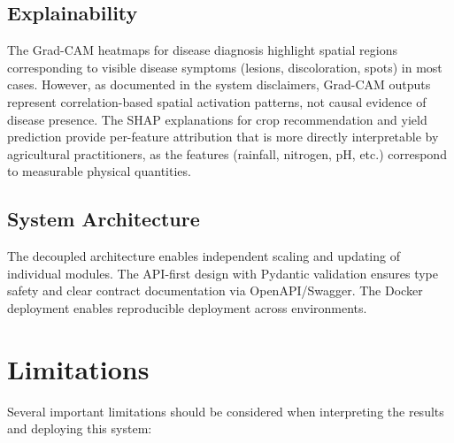 \documentclass[conference]{IEEEtran}
\begin{document}
\subsection{Explainability}
The Grad-CAM heatmaps for disease diagnosis highlight spatial regions corresponding to visible disease symptoms (lesions, discoloration, spots) in most cases. However, as documented in the system disclaimers, Grad-CAM outputs represent correlation-based spatial activation patterns, not causal evidence of disease presence. The SHAP explanations for crop recommendation and yield prediction provide per-feature attribution that is more directly interpretable by agricultural practitioners, as the features (rainfall, nitrogen, pH, etc.) correspond to measurable physical quantities.

\subsection{System Architecture}
The decoupled architecture enables independent scaling and updating of individual modules. The API-first design with Pydantic validation ensures type safety and clear contract documentation via OpenAPI/Swagger. The Docker deployment enables reproducible deployment across environments.


\section{Limitations}
\label{sec:limitations}

Several important limitations should be considered when interpreting the results and deploying this system:
\end{document}
